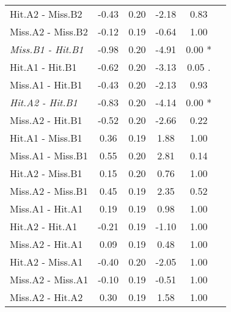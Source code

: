 \begin{landscape}
\begin{table}
\begin{multicols}{4}
\begin{tabular}{|l|*{5}{c|}}
Hit.A2 - Miss.B2 & -0.43 & 0.20 & -2.18 & 0.83 \\ 
Miss.A2 - Miss.B2 & -0.12 & 0.19 & -0.64 & 1.00 \\ 
\textit{Miss.B1 - Hit.B1} & -0.98 & 0.20 & -4.91 & 0.00 * \\ 
Hit.A1 - Hit.B1 & -0.62 & 0.20 & -3.13 & 0.05 . \\ 
Miss.A1 - Hit.B1 & -0.43 & 0.20 & -2.13 & 0.93 \\ 
\textit{Hit.A2 - Hit.B1} & -0.83 & 0.20 & -4.14 & 0.00 * \\ 
Miss.A2 - Hit.B1 & -0.52 & 0.20 & -2.66 & 0.22 \\ 
Hit.A1 - Miss.B1 & 0.36 & 0.19 & 1.88 & 1.00 \\ 
Miss.A1 - Miss.B1 & 0.55 & 0.20 & 2.81 & 0.14 \\ 
Hit.A2 - Miss.B1 & 0.15 & 0.20 & 0.76 & 1.00 \\ 
Miss.A2 - Miss.B1 & 0.45 & 0.19 & 2.35 & 0.52 \\ 
Miss.A1 - Hit.A1 & 0.19 & 0.19 & 0.98 & 1.00 \\ 
Hit.A2 - Hit.A1 & -0.21 & 0.19 & -1.10 & 1.00 \\ 
Miss.A2 - Hit.A1 & 0.09 & 0.19 & 0.48 & 1.00 \\ 
Hit.A2 - Miss.A1 & -0.40 & 0.20 & -2.05 & 1.00 \\ 
Miss.A2 - Miss.A1 & -0.10 & 0.19 & -0.51 & 1.00 \\ 
Miss.A2 - Hit.A2 & 0.30 & 0.19 & 1.58 & 1.00 \\ 
\hline
\end{tabular}


\end{multicols}
\end{table}
\end{landscape}
